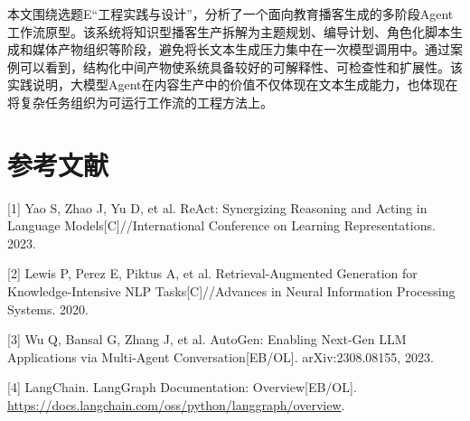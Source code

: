 \documentclass{rjthesis}
\begin{document}
本文围绕选题E“工程实践与设计”，分析了一个面向教育播客生成的多阶段Agent工作流原型。该系统将知识型播客生产拆解为主题规划、编导计划、角色化脚本生成和媒体产物组织等阶段，避免将长文本生成压力集中在一次模型调用中。通过案例可以看到，结构化中间产物使系统具备较好的可解释性、可检查性和扩展性。该实践说明，大模型Agent在内容生产中的价值不仅体现在文本生成能力，也体现在将复杂任务组织为可运行工作流的工程方法上。

\section*{参考文献}

[1] Yao S, Zhao J, Yu D, et al. ReAct: Synergizing Reasoning and Acting in Language Models[C]//International Conference on Learning Representations. 2023.

[2] Lewis P, Perez E, Piktus A, et al. Retrieval-Augmented Generation for Knowledge-Intensive NLP Tasks[C]//Advances in Neural Information Processing Systems. 2020.

[3] Wu Q, Bansal G, Zhang J, et al. AutoGen: Enabling Next-Gen LLM Applications via Multi-Agent Conversation[EB/OL]. arXiv:2308.08155, 2023.

[4] LangChain. LangGraph Documentation: Overview[EB/OL]. \url{https://docs.langchain.com/oss/python/langgraph/overview}.
\end{document}
